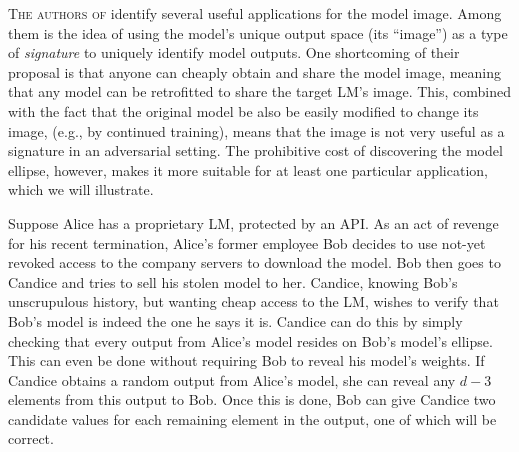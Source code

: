 \documentclass{article}
\begin{document}
\lettrine{T}{he authors of \citet{Finlayson2024LogitsOA}} identify several useful applications for the model image. 
Among them is the idea of using the model's unique output space (its ``image'') 
as a type of \textit{signature} to uniquely identify model outputs.
One shortcoming of their proposal 
is that anyone can cheaply obtain and share the model image,
meaning that any model can be retrofitted to share the target LM's image. 
This, combined with the fact that the original model be also be easily modified to change its image, (e.g., by continued training), means that the image is not very useful as a signature in an adversarial setting.
The prohibitive cost of discovering the model ellipse, however, makes it more suitable for at least one particular application, which we will illustrate.

Suppose Alice has a proprietary LM, protected by an API.
As an act of revenge for his recent termination,
Alice's former employee Bob decides to use not-yet revoked access to the company servers to download the model.
Bob then goes to Candice and tries to sell his stolen model to her.
Candice, knowing Bob's unscrupulous history, but wanting cheap access to the LM,
wishes to verify that Bob's model is indeed the one he says it is.
Candice can do this by simply checking that every output from Alice's model resides on Bob's model's ellipse. 
This can even be done without requiring Bob to reveal his model's weights.
If Candice obtains a random output from Alice's model, she can reveal any \(d-3\) elements from this output to Bob. Once this is done, Bob can give Candice two candidate values for each remaining element in the output, one of which will be correct.

\begin{figure}
  \centering
  \small
  \hfill
\end{figure}





\end{document}
